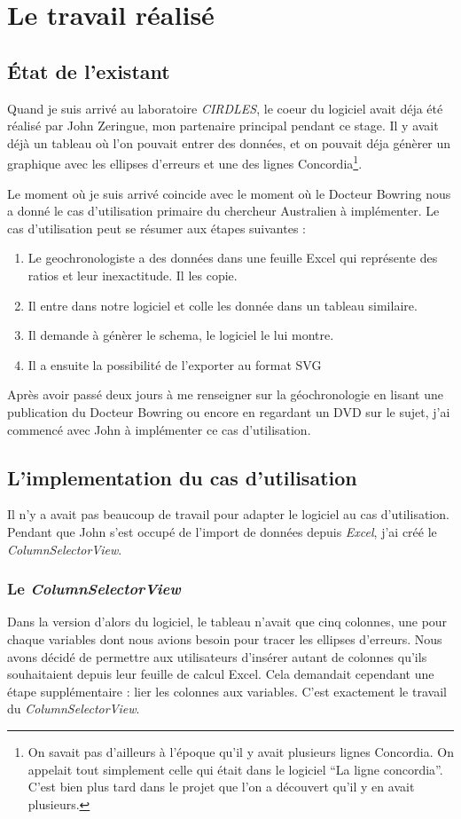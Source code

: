 \chapter{Le travail réalisé}
\section{État de l'existant}
Quand je suis arrivé au laboratoire \textit{CIRDLES}, le coeur du logiciel avait déja été réalisé par John Zeringue, mon partenaire principal pendant ce stage. Il y avait déjà un tableau où l'on pouvait entrer des données, et on pouvait déja génèrer un graphique avec les ellipses d'erreurs et une des lignes Concordia\footnote{On savait pas d'ailleurs à l'époque qu'il y avait plusieurs lignes Concordia. On appelait tout simplement celle qui était dans le logiciel ``La ligne concordia''. C'est bien plus tard dans le projet que l'on a découvert qu'il y en avait plusieurs.}.

Le moment où je suis arrivé coincide avec le moment où le Docteur Bowring nous a donné le cas d'utilisation primaire du chercheur Australien à implémenter. Le cas d'utilisation peut se résumer aux étapes suivantes :
\begin{enumerate}
\item Le geochronologiste a des données dans une feuille Excel qui représente des ratios et leur inexactitude. Il les copie.
\item Il entre dans notre logiciel et colle les donnée dans un tableau similaire.
\item Il demande à génèrer le schema, le logiciel le lui montre.
\item Il a ensuite la possibilité de l'exporter au format SVG
\end{enumerate}

Après avoir passé deux jours à me renseigner sur la géochronologie en lisant une publication du Docteur Bowring ou encore en regardant un DVD sur le sujet,
j'ai commencé avec John à implémenter ce cas d'utilisation.

\section{L'implementation du cas d'utilisation}
Il n'y a avait pas beaucoup de travail pour adapter le logiciel au cas d'utilisation. Pendant que John s'est occupé de l'import de données depuis \textit{Excel}, j'ai créé le \textit{ColumnSelectorView}.
\subsection{Le \textit{ColumnSelectorView}}
Dans la version d'alors du logiciel, le tableau n'avait que cinq colonnes, une pour chaque variables dont nous avions besoin pour tracer les ellipses d'erreurs. Nous avons décidé de permettre aux utilisateurs d'insérer autant de colonnes qu'ils souhaitaient depuis leur feuille de calcul Excel. Cela demandait cependant une étape supplémentaire : lier les colonnes aux variables. C'est exactement le travail du \textit{ColumnSelectorView}.

